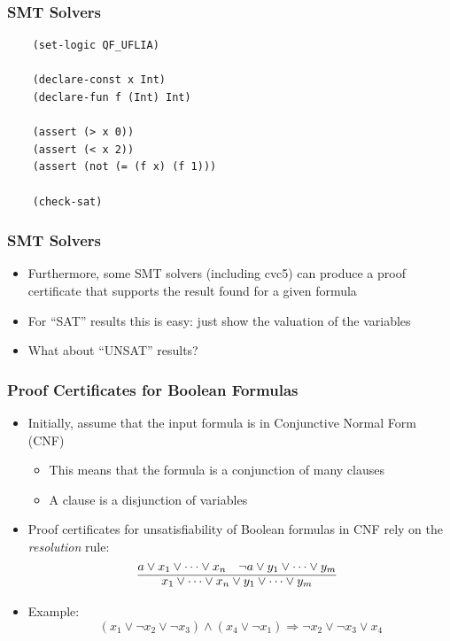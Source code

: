 \documentclass[usepdftitle=false,aspectratio=169,usenames,dvipsnames]{beamer}
\newcommand\vitem{\vfill\item}
\begin{document}
\begin{frame}[fragile]
  \frametitle{SMT Solvers}
  \begin{verbatim}
    (set-logic QF_UFLIA)

    (declare-const x Int)
    (declare-fun f (Int) Int)

    (assert (> x 0))
    (assert (< x 2))
    (assert (not (= (f x) (f 1)))

    (check-sat)
  \end{verbatim}
\end{frame}

\begin{frame}
  \frametitle{SMT Solvers}
  \begin{itemize}
    \item Furthermore, some SMT solvers (including cvc5) can produce a proof certificate that supports the result found for a given formula
    \vitem For ``SAT'' results this is easy: just show the valuation of the variables
    \vitem What about ``UNSAT'' results?
  \end{itemize}
\end{frame}


\begin{frame}
  \frametitle{Proof Certificates for Boolean Formulas}
    \begin{itemize}
    \item Initially, assume that the input formula is in Conjunctive Normal Form (CNF)
    \begin{itemize}
      \item This means that the formula is a conjunction of many clauses
      \item A clause is a disjunction of variables
    \end{itemize}
    \vitem Proof certificates for unsatisfiability of Boolean formulas in CNF rely on the \textit{resolution} rule:
          \vfill
  \[
    \infer[]{x_{1} \vee \cdots \vee x_{n} \vee y_{1} \vee \cdots \vee y_{m}}{a \vee x_{1} \vee \cdots \vee x_{n} & \neg a \vee y_{1} \vee \cdots \vee y_{m}}
  \]
  \vitem Example:
            \vfill
          $$ (x_{1} \vee \neg x_{2} \vee \neg x_{3}) \wedge (x_{4} \vee \neg x_{1}) \Rightarrow \neg x_{2} \vee \neg x_{3} \vee x_{4} $$
   \end{itemize}
\end{frame}
\end{document}
